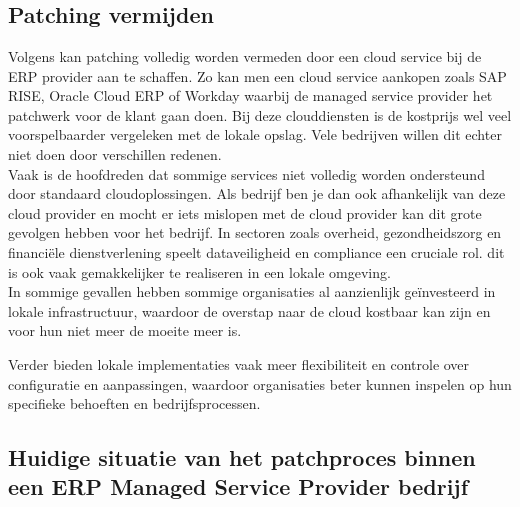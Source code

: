 
\chapter{}
\label{ch:corpus}

\section{Patching vermijden}

Volgens \textcite{Munck2024} kan patching volledig worden vermeden door een cloud service bij de ERP provider aan te schaffen. Zo kan men een cloud service aankopen zoals SAP RISE, Oracle Cloud ERP of Workday waarbij de managed service provider het patchwerk voor de klant gaan doen. Bij deze clouddiensten is de kostprijs wel veel voorspelbaarder vergeleken met de lokale opslag. Vele bedrijven
 willen dit echter niet doen door verschillen redenen.\\

 
Vaak is de hoofdreden dat sommige services niet volledig worden ondersteund door standaard cloudoplossingen. Als bedrijf ben je dan ook afhankelijk van deze cloud provider en mocht er iets mislopen met de cloud provider kan dit grote gevolgen hebben voor het bedrijf.
In sectoren zoals overheid, gezondheidszorg en financiële dienstverlening speelt dataveiligheid en compliance een cruciale rol. dit is ook vaak gemakkelijker te realiseren in een lokale omgeving.\\ 

In sommige gevallen hebben sommige organisaties al aanzienlijk geïnvesteerd in lokale infrastructuur, waardoor de overstap naar de cloud kostbaar kan zijn en voor hun niet meer de moeite meer is.

Verder bieden lokale implementaties vaak meer flexibiliteit en controle over configuratie en aanpassingen, waardoor organisaties beter kunnen inspelen op hun specifieke behoeften en 
bedrijfsprocessen.\\


\section{Huidige situatie van het patchproces binnen een ERP Managed Service Provider bedrijf}

